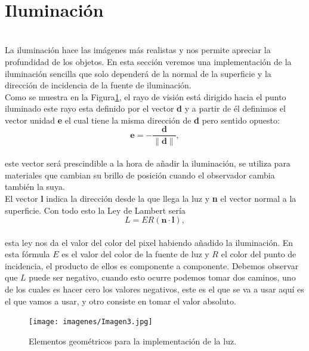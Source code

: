 ${ }$\\
\section{Iluminación}
${ }$\\

La iluminación hace las imágenes más realistas y nos permite apreciar la profundidad de los objetos. En esta sección veremos una implementación de la iluminación sencilla que solo dependerá de la normal de la superficie y la dirección de incidencia de la fuente de iluminación. 
${ }$\\

Como se muestra en la Figura\ref{fig:etiq_5}, el rayo de visión está dirigido hacia el punto iluminado este rayo esta definido por el vector \textbf{d} y a partir de él definimos el vector unidad \textbf{e} el cual tiene la misma dirección de \textbf{d} pero sentido opuesto:
${ }$\\


\[
	\textbf{e} = - \frac{\textbf{d}}{\|\textbf{d}\|},
\]
${ }$\\
este vector será prescindible a la hora de añadir la iluminación, se utiliza para materiales que cambian su brillo de posición cuando el observador cambia también la suya.
${ }$\\


El vector \textbf{l} indica la dirección desde la que llega la luz y \textbf{n} el vector normal a la superficie. Con todo esto la Ley de Lambert sería
${ }$\\
\[
	L = ER(\textbf{n}\cdot \textbf{l}),
\]
${ }$\\
esta ley nos da el valor del color del pixel habiendo añadido la iluminación. En esta fórmula $E$ es el valor del color de la fuente de luz y $R$ el color del punto de incidencia, el producto de ellos es componente a componente. Debemos observar que $L$ puede ser negativo, cuando esto ocurre podemos tomar dos caminos, uno de los cuales es hacer cero los valores negativos, este es el que se va a usar aquí es el que vamos a usar, y otro consiste en tomar el valor absoluto.
	${ }$\\	


\begin{figure}[h]
	\begin{center}
		\texttt{[image: imagenes/Imagen3.jpg]}
	\end{center}
	\caption{Elementos geométricos para la implementación de la luz.}
	\label{fig:etiq_5}
\end{figure}





